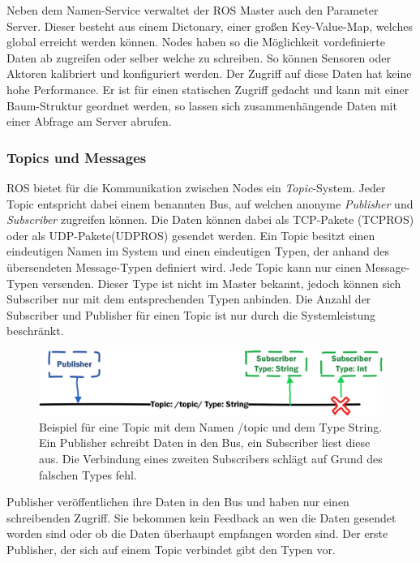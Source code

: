  Neben dem Namen-Service verwaltet der ROS Master auch den Parameter Server. Dieser besteht aus einem Dictonary, einer großen Key-Value-Map, welches global erreicht werden können. Nodes haben so die Möglichkeit vordefinierte Daten ab zugreifen oder selber welche zu schreiben. So können Sensoren oder Aktoren kalibriert und konfiguriert werden. Der Zugriff auf diese Daten hat keine hohe Performance. Er ist für einen statischen Zugriff gedacht und kann mit einer Baum-Struktur geordnet werden, so lassen sich zusammenhängende Daten mit einer Abfrage am Server abrufen.

\subsubsection{Topics und Messages}
\label{sec:basic-ros-topics}

ROS bietet für die Kommunikation zwischen Nodes ein \textit{Topic}-System. Jeder Topic entspricht dabei einem benannten Bus, auf welchen anonyme \textit{Publisher} und \textit{Subscriber} zugreifen können. Die Daten können dabei als TCP-Pakete (TCPROS) oder als UDP-Pakete(UDPROS) gesendet werden. Ein Topic besitzt einen eindeutigen Namen im System und einen eindeutigen Typen, der anhand des übersendeten Message-Typen definiert wird. Jede Topic kann nur einen Message-Typen versenden. Dieser Type ist nicht im Master bekannt, jedoch können sich Subscriber nur mit dem entsprechenden Typen anbinden. Die Anzahl der Subscriber und Publisher für einen Topic ist nur durch die Systemleistung beschränkt.

\begin{figure}[h]
	\centering
	\includegraphics[scale=0.8]{fig/topic}   
	\caption[Topic Beispiel]{Beispiel für eine Topic mit dem Namen /topic und dem Type String. Ein Publisher schreibt Daten in den Bus, ein Subscriber liest diese aus. Die Verbindung eines zweiten Subscribers schlägt auf Grund des falschen Types fehl.}
	\label{fig:basic-ros-topic}
\end{figure}

Publisher veröffentlichen ihre Daten in den Bus und haben nur einen schreibenden Zugriff. Sie bekommen kein Feedback an wen die Daten gesendet worden sind oder ob die Daten überhaupt empfangen worden sind. Der erste Publisher, der sich auf einem Topic verbindet gibt den Typen vor.

